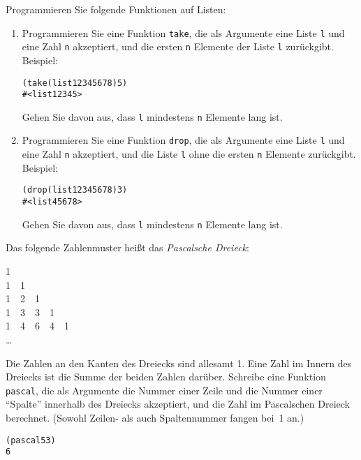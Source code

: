 \begin{aufgabe}
  Programmieren Sie folgende Funktionen auf Listen:
  \begin{enumerate}
  \item Programmieren Sie eine Funktion \texttt{take}, die als
    Argumente eine Liste \texttt{l} und eine Zahl \texttt{n}
    akzeptiert, und die ersten \texttt{n} Elemente der Liste
    \texttt{l} zurückgibt. Beispiel:
    \begin{alltt}
      (take (list 1 2 3 4 5 6 7 8) 5)
      \evalsto{} #<list 1 2 3 4 5>
    \end{alltt}
    Gehen Sie davon aus, dass \texttt{l} mindestens \texttt{n}
    Elemente lang ist.

  \item Programmieren Sie eine Funktion \texttt{drop}, die als
    Argumente eine Liste \texttt{l} und eine Zahl \texttt{n}
    akzeptiert, und die Liste \texttt{l} ohne die ersten \texttt{n}
    Elemente zurückgibt.  Beispiel:
    \begin{alltt}
      (drop (list 1 2 3 4 5 6 7 8) 3)
      \evalsto{} #<list 4 5 6 7 8>
    \end{alltt}
    Gehen Sie davon aus, dass \texttt{l} mindestens \texttt{n}
    Elemente lang ist.
    \end{enumerate}
\end{aufgabe}

\begin{aufgabe}
  Das folgende Zahlenmuster heißt das \textit{Pascalsche
    Dreieck}:
  \begin{center}
    1\\
    1~~1\\
    1~~2~~1\\
    1~~3~~3~~1\\
    1~~4~~6~~4~~1\\
    \ldots
  \end{center}
  Die Zahlen an den Kanten des Dreiecks sind allesamt 1.  Eine Zahl im
  Innern des Dreiecks ist die Summe der beiden Zahlen darüber.
  Schreibe eine Funktion \texttt{pascal}, die als Argumente die Nummer
  einer Zeile und die Nummer einer "`Spalte"' innerhalb des Dreiecks
  akzeptiert, und die Zahl im Pascalschen Dreieck berechnet.  (Sowohl
  Zeilen- als auch Spaltennummer fangen bei~1 an.)
%
\begin{alltt}
(pascal 5 3)
\evalsto{} 6
\end{alltt}
\end{aufgabe}

